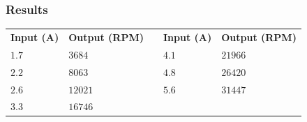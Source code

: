 \subsubsection{Results}
%
\begin{table}[H]
\begin{tabular}{|l|l|l| l|l|}
\cline{1-2}\cline{4-5}%
  \textbf{Input (A)}   & \textbf{Output (RPM)} &\phantom{hey}& \textbf{Input (A)}   & \textbf{Output (RPM)} \\
\cline{1-2}\cline{4-5}%
  $1.7$                &             $3684$    &             & $4.1$                & $21966$               \\
\cline{1-2}\cline{4-5}%
  $2.2$                &             $8063$    &             & $4.8$                & $26420$               \\
\cline{1-2}\cline{4-5}%
  $2.6$                &             $12021$   &             & $5.6$                & $31447$               \\
\cline{1-2}\cline{4-5}%
  $3.3$                &             $16746$  \\
\cline{1-2}%
\end{tabular}
\end{table}
%
